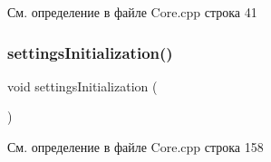 См. определение в файле Core.\+cpp строка 41

\mbox{\label{group__corecpp_ga242d25c7a9a1b7212bb890023c8131f5}} 
\subsubsection{\texorpdfstring{settings\+Initialization()}{settingsInitialization()}}
{\footnotesize\ttfamily void settings\+Initialization (\begin{DoxyParamCaption}{ }\end{DoxyParamCaption})}



См. определение в файле Core.\+cpp строка 158

